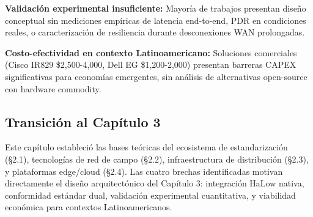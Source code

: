 \textbf{Validación experimental insuficiente:} Mayoría de trabajos presentan diseño conceptual sin mediciones empíricas de latencia end-to-end, PDR en condiciones reales, o caracterización de resiliencia durante desconexiones WAN prolongadas.

\textbf{Costo-efectividad en contexto Latinoamericano:} Soluciones comerciales (Cisco IR829 \$2,500-4,000, Dell EG \$1,200-2,000) presentan barreras CAPEX significativas para economías emergentes, sin análisis de alternativas open-source con hardware commodity.

\subsection{Transición al Capítulo 3}

Este capítulo estableció las bases teóricas del ecosistema de estandarización (§2.1), tecnologías de red de campo (§2.2), infraestructura de distribución (§2.3), y plataformas edge/cloud (§2.4). Las cuatro brechas identificadas motivan directamente el diseño arquitectónico del Capítulo 3: integración HaLow nativa, conformidad estándar dual, validación experimental cuantitativa, y viabilidad económica para contextos Latinoamericanos.

